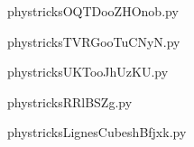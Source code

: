     

    \clearpage
    


    \newcommand{\CaptionFigOQTDooZHOnob}{<+Type your caption here+>}
    \begin{center}
        
    \end{center}
    phystricksOQTDooZHOnob.py

    

    \clearpage
    


    \newcommand{\CaptionFigTVRGooTuCNyN}{<+Type your caption here+>}
    \begin{center}
        
    \end{center}
    phystricksTVRGooTuCNyN.py

    

    \clearpage
    


    \newcommand{\CaptionFigUKTooJhUzKU}{<+Type your caption here+>}
    \begin{center}
        
    \end{center}
    phystricksUKTooJhUzKU.py

    

    \clearpage
    


    \newcommand{\CaptionFigRRlBSZg}{<+Type your caption here+>}
    \begin{center}
        
    \end{center}
    phystricksRRlBSZg.py

    

    \clearpage
    


    \newcommand{\CaptionFigLignesCubeshBfjxk}{<+Type your caption here+>}
    \begin{center}
        
    \end{center}
    phystricksLignesCubeshBfjxk.py

    

    \clearpage
    


